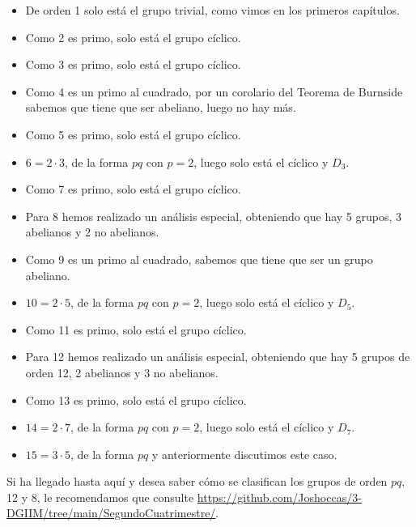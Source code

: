\begin{itemize}
    \item De orden 1 solo está el grupo trivial, como vimos en los primeros capítulos.
    \item Como 2 es primo, solo está el grupo cíclico.
    \item Como 3 es primo, solo está el grupo cíclico.
    \item Como 4 es un primo al cuadrado, por un corolario del Teorema de Burnside sabemos que tiene que ser abeliano, luego no hay más.
    \item Como 5 es primo, solo está el grupo cíclico.
    \item $6 = 2\cdot 3$, de la forma $pq$ con $p=2$, luego solo está el cíclico y $D_3$.
    \item Como 7 es primo, solo está el grupo cíclico.
    \item Para 8 hemos realizado un análisis especial, obteniendo que hay 5 grupos, 3 abelianos y 2 no abelianos.
    \item Como 9 es un primo al cuadrado, sabemos que tiene que ser un grupo abeliano.
    \item $10 = 2\cdot 5$, de la forma $pq$ con $p =2$, luego solo está el cíclico y $D_5$.
    \item Como 11 es primo, solo está el grupo cíclico.
    \item Para 12 hemos realizado un análisis especial, obteniendo que hay 5 grupos de orden 12, 2 abelianos y 3 no abelianos.
    \item Como 13 es primo, solo está el grupo cíclico.
    \item $14 = 2\cdot 7$, de la forma $pq$ con $p=2$, luego solo está el cíclico y $D_7$.
    \item $15 = 3\cdot 5$, de la forma $pq$ y anteriormente discutimos este caso.
\end{itemize}
Si ha llegado hasta aquí y desea saber cómo se clasifican los grupos de orden $pq$, 12 y 8, le recomendamos que consulte \url{https://github.com/Joshoccas/3-DGIIM/tree/main/SegundoCuatrimestre/}.
